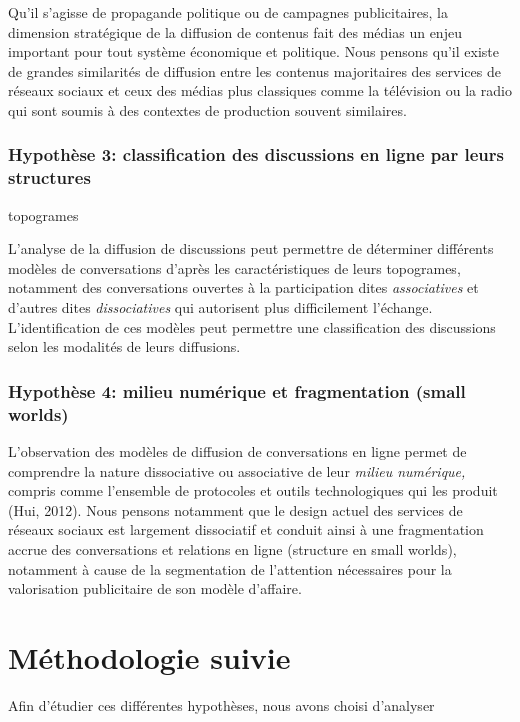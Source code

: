 Qu{\textquoteright}il s{\textquoteright}agisse de propagande politique ou de campagnes publicitaires, la dimension stratégique de la diffusion de contenus fait des médias un enjeu important pour tout système économique et politique. Nous pensons qu{\textquoteright}il existe de grandes similarités de diffusion entre les contenus majoritaires des services de réseaux sociaux et ceux des médias plus classiques comme la télévision ou la radio qui sont soumis à des contextes de production souvent similaires.

\subsubsection{Hypothèse 3: classification des discussions en ligne par leurs structures} 

topogrames

L{\textquoteright}analyse de la diffusion de discussions peut permettre de déterminer différents modèles de conversations d{\textquoteright}après les caractéristiques de leurs topogrames, notamment des conversations ouvertes à la participation dites \textit{associatives }et d{\textquoteright}autres dites \textit{dissociatives} qui autorisent plus difficilement l{\textquoteright}échange. L{\textquoteright}identification de ces modèles peut permettre une classification des discussions selon les modalités de leurs diffusions.  

\subsubsection{Hypothèse 4: milieu numérique et fragmentation (small worlds)} 

L{\textquoteright}observation des modèles de diffusion de conversations en ligne permet de comprendre la nature dissociative ou associative de leur \textit{milieu numérique, }compris comme l{\textquoteright}ensemble de protocoles et outils technologiques qui les produit (Hui, 2012). Nous pensons notamment que le design actuel des services de réseaux sociaux est largement dissociatif et conduit ainsi à une fragmentation accrue des conversations et relations en ligne (structure en small worlds), notamment à cause de la segmentation de l{\textquoteright}attention nécessaires pour la valorisation publicitaire de son modèle d{\textquoteright}affaire.  


\section{Méthodologie suivie} 

Afin d{\textquoteright}étudier ces différentes hypothèses, nous avons choisi d{\textquoteright}analyser 




